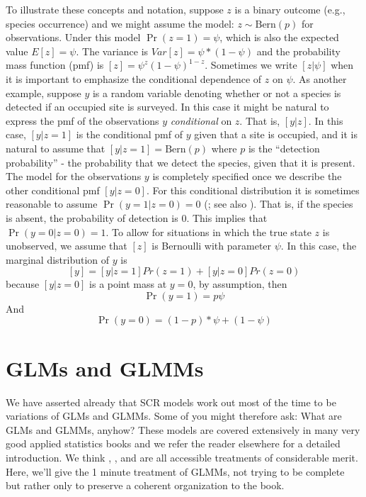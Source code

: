 To illustrate these concepts and notation, suppose $z$ is a binary
outcome (e.g., species occurrence) and we might assume the model: $z
\sim \mbox{Bern}(p)$ for observations.  Under this model $\Pr(z=1) =
\psi$, which is also the expected value $E[z] = \psi$. The variance is
$Var[z] = \psi*(1-\psi)$ and the probability mass function (pmf) is $[z]
= \psi^{z} (1-\psi)^{1-z}$. Sometimes we write $[z|\psi]$ when it is
important to emphasize the conditional dependence of $z$ on $\psi$. As
another example, suppose $y$ is a random variable denoting whether or
not a species is detected if an occupied site is surveyed. In this
case it might be natural to express the pmf of the observations $y$
{\it conditional} on $z$. That is, $[y|z]$. In this case, $[y|z=1]$ is
the conditional pmf of $y$ given that a site is occupied, and it is
natural to assume that $[y|z=1] = \mbox{Bern}(p)$ where $p$ is the
``detection probability'' - the probability that we detect the
species, given that it is present. The model for the observations $y$
is completely specified once we describe the other conditional pmf
$[y|z=0]$. For this conditional distribution it is sometimes
reasonable to assume $\Pr(y=1|z=0) = 0$ (\citet{mackenzie_etal:2002};
see also \citet{royle_link:2006}). That is, if the species is absent,
the probability of detection is 0. This implies that
$\Pr(y=0|z=0)=1$. To allow for situations in which the true state $z$
is unobserved, we  assume that $[z]$ is Bernoulli with parameter
$\psi$.  In this case, the marginal distribution of $y$ is
\[
 [y] = [y|z=1]Pr(z=1) + [y|z=0]Pr(z=0)
\]
because $[y|z=0]$ is a point mass at $y=0$, by assumption, then
\[
\Pr(y=1) = p \psi
\]
And
\[
\Pr(y=0) = (1-p)*\psi + (1-\psi)
\]


\section{
GLMs and GLMMs}
We have asserted already that SCR models work out most of the time to
be variations of GLMs and GLMMs. Some of you might therefore ask: What
are GLMs and GLMMs, anyhow?   These models are covered extensively in
many very good applied statistics books and we refer the reader
elsewhere for a detailed introduction. We think \citet{kery:2010},
\citet{kery_schaub:2011}, and \citet{zuur_etal:2009} are all
accessible treatments of considerable merit. Here, we'll give the 1
minute
treatment of GLMMs, not trying to be complete but rather only
to preserve a coherent organization to the book.


